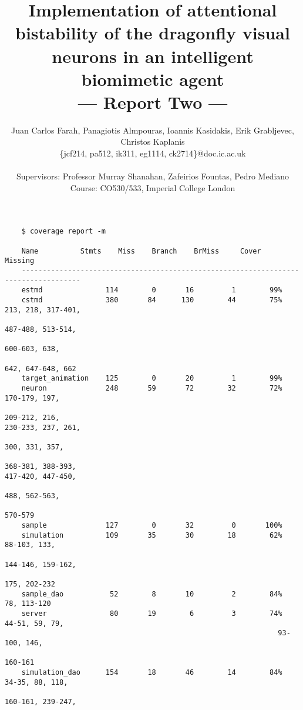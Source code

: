 \documentclass[a4paper,11pt]{article}
\title{Implementation of attentional bistability of the dragonfly visual neurons in an intelligent biomimetic agent\\\Large{--- Report Two ---}}
\author{Juan Carlos Farah, Panagiotis Almpouras, Ioannis Kasidakis, Erik Grabljevec, Christos Kaplanis\\
       \{jcf214, pa512, ik311, eg1114, ck2714\}@doc.ic.ac.uk\\ \\
       \small{Supervisors: Professor Murray Shanahan, Zafeirios Fountas, Pedro Mediano}\\
       \small{Course: CO530/533, Imperial College London}
}
\begin{document}
\maketitle

\begin{verbatim}
    $ coverage report -m

    Name 	      Stmts    Miss    Branch    BrMiss     Cover   Missing
    ------------------------------------------------------------------------------------
    estmd               114        0       16         1        99%   
    cstmd               380       84      130        44        75%   213, 218, 317-401,
                                                                     487-488, 513-514,
                                                                     600-603, 638,
                                                                     642, 647-648, 662
    target_animation    125        0       20         1        99%   
    neuron              248       59       72        32        72%   170-179, 197,
                                                                     209-212, 216,                                                                                      	                                                                 230-233, 237, 261,
                                                                     300, 331, 357, 
                                                                     368-381, 388-393,                                                                                     	                                                                 417-420, 447-450,
                                                                     488, 562-563,
                                                                     570-579
    sample              127        0       32         0       100%   
    simulation          109       35       30        18        62%   88-103, 133, 
                                                                     144-146, 159-162, 
                                                                     175, 202-232
    sample_dao           52        8       10         2        84%   78, 113-120
    server               80       19        6         3        74%   44-51, 59, 79, 
    	                                                         93-100, 146,
                                                                     160-161
    simulation_dao      154       18       46        14        84%   34-35, 88, 118, 
                                                                     160-161, 239-247,

\end{verbatim}
\end{document}
